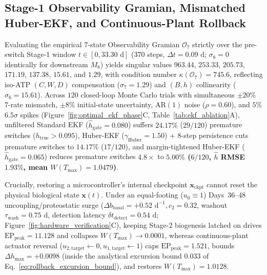 \documentclass[11pt]{article}
\theoremstyle{plain}
\theoremstyle{remark}
\begin{document}
\subsection{Stage-1 Observability Gramian, Mismatched Huber-EKF, and Continuous-Plant Rollback}
Evaluating the empirical 7-state Observability Gramian $\mathcal{O}_7$ strictly over the pre-switch Stage-1 window $t \in [0, 33.30\text{ d}]$ ($370$ steps, $\Delta t = 0.09\text{ d}$; $\sigma_8 = 0$ identically for downstream $M_8$) yields singular values $963.44$, $253.33$, $205.73$, $171.19$, $137.38$, $15.61$, and $1.29$, with condition number $\kappa(\mathcal{O}_7) = 745.6$, reflecting iso-ATP $(C, W, D)$ compensation ($\sigma_7 = 1.29$) and $(B, h)$ collinearity ($\sigma_6 = 15.61$). Across $120$ closed-loop Monte Carlo trials with simultaneous $\pm 20\%$ 7-rate mismatch, $\pm 8\%$ initial-state uncertainty, $\mathrm{AR}(1)$ noise ($\rho = 0.60$), and $5\%$ $6.5\sigma$ spikes (Figure~\ref{fig:optimal_ekf_phase}C, Table~\ref{tab:ekf_ablation}A), unfiltered Standard EKF ($\hat{h}_{\mathrm{gate}} = 0.080$) suffers $24.17\%$ ($29/120$) premature switches ($h_{\mathrm{true}} > 0.095$), Huber-EKF ($\gamma_{\mathrm{Huber}} = 1.50$) + 8-step persistence cuts premature switches to $14.17\%$ ($17/120$), and margin-tightened Huber-EKF ($\hat{h}_{\mathrm{gate}} = 0.065$) reduces premature switches $4.8\times$ to \textbf{$5.00\%$ ($6/120$, $\hat{h}$ RMSE $1.93\%$, mean $W(T_{\max}) = 1.0479$)}.

Crucially, restoring a microcontroller's internal checkpoint $\mathbf{x}_{\mathrm{ckpt}}$ cannot reset the physical biological state $\mathbf{x}(t)$. Under an equal-footing ($u_0 \equiv 1$) Days~36--48 uncoupling/proteostatic surge ($\Delta b_{\mathrm{basal}} = +0.52\text{ d}^{-1}, c_2 = 0.32$, washout $\tau_{\mathrm{wash}} = 0.75\text{ d}$, detection latency $\delta t_{\mathrm{detect}} = 0.54\text{ d}$; Figure~\ref{fig:hardware_verification}C), keeping Stage-2 biogenesis latched on drives $\mathrm{EP}_{\mathrm{peak}} = 11.128$ and collapses $W(T_{\max}) \to 0.0001$, whereas continuous-plant actuator reversal ($u_{2,\mathrm{target}} \leftarrow 0, u_{1,\mathrm{target}} \leftarrow 1$) caps $\mathrm{EP}_{\mathrm{peak}} = 1.521$, bounds $\Delta h_{\max} = +0.0098$ (inside the analytical excursion bound $0.033$ of Eq.~\ref{eq:rollback_excursion_bound}), and restores $W(T_{\max}) = 1.0128$.
\end{document}
